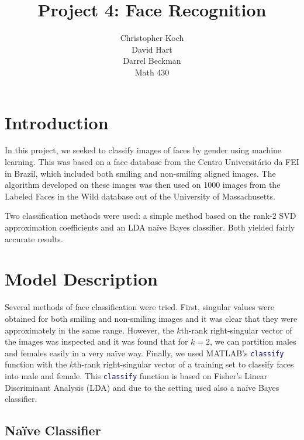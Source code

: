 \documentclass[hidelinks,11pt]{article}
\begin{document}
\title{Project 4: Face Recognition}
\author{Christopher Koch\\David Hart\\Darrel Beckman\\
Math 430}
\maketitle

\section{Introduction}
\label{sec:intro}

In this project, we seeked to classify images of faces by gender using machine
learning. This was based on a face database\cite{fei} from the Centro
Universitário da FEI in Brazil, which included both smiling and non-smiling
aligned images. The algorithm developed on these images was then used on 1000
images from the Labeled Faces in the Wild database out of the University of
Massachusetts\cite{lfw}. 

Two classification methods were used: a simple method based on the rank-2
SVD approximation coefficients and an LDA na\"ive Bayes classifier. Both yielded
fairly accurate results.

\section{Model Description}
\label{sec:model}

Several methods of face classification were tried. First, singular values were
obtained for both smiling and non-smiling images and it was clear that they were
approximately in the same range. However, the $k$th-rank right-singular vector
of the images was inspected and it was found that for $k = 2$, we can partition
males and females easily in a very na\"ive way. Finally, we used MATLAB's
\lstinline[language=Matlab]{classify} function with the $k$th-rank
right-singular vector of a training set to classify faces into male and female.
This \lstinline[language=Matlab]{classify} function is based on Fisher's Linear
Discriminant Analysis (LDA) and due to the setting used also a na\"ive Bayes
classifier.

\subsection{Na\"ive Classifier}
\label{sec:model:naive}

\end{document}
